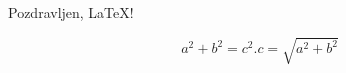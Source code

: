 \documentclass{article}
\begin{document}
Pozdravljen, LaTeX!

\[
a^2 + b^2 = c^2 .  c= \sqrt{a^2 + b^2}
\]
\end{document}

